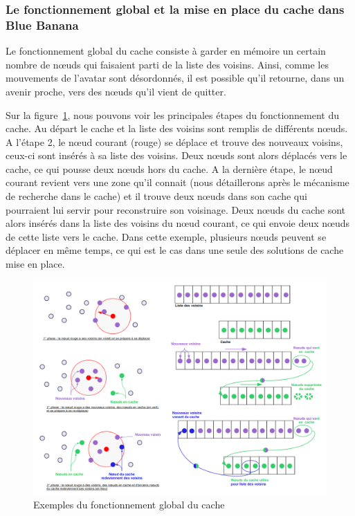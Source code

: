 \subsubsection{Le fonctionnement global et la mise en place du cache dans Blue Banana}
Le fonctionnement global du cache consiste à garder en mémoire un certain nombre de nœuds qui faisaient parti de la liste des voisins. Ainsi, comme les mouvements de l'avatar sont désordonnés, il est possible qu'il retourne, dans un avenir proche, vers des nœuds qu'il vient de quitter. 
\par Sur la figure~\ref{cacheW}, nous pouvons voir les principales étapes du fonctionnement du cache. Au départ le cache et la liste des voisins sont remplis de différents nœuds. A l'étape 2, le nœud courant (rouge) se déplace et trouve des nouveaux voisins, ceux-ci sont insérés à sa liste des voisins. Deux nœuds sont alors déplacés vers le cache, ce qui pousse deux nœuds hors du cache. A la dernière étape, le nœud courant revient vers une zone qu'il connait (nous détaillerons après le mécanisme de recherche dans le cache) et il trouve deux nœuds dans son cache qui pourraient lui servir pour reconstruire son voisinage. Deux nœuds du cache sont alors insérés dans la liste des voisins du nœud courant, ce qui envoie deux nœuds de cette liste vers le cache. Dans cette exemple, plusieurs nœuds peuvent se déplacer en même temps, ce qui est le cas dans une seule des solutions de cache mise en place.
	\begin{figure}[!h]
        \centering
        \includegraphics[scale=0.35]{./Ressources/Images/cacheWextends.png}
        \caption{Exemples du fonctionnement global du cache}
        \label{cacheW}
        \end{figure} 
